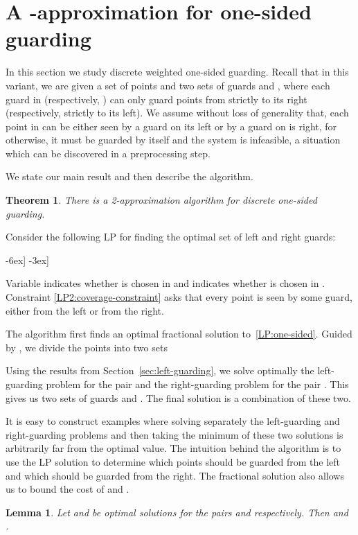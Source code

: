 \documentclass[11pt]{article}
\newtheorem{theorem}{Theorem}
\newtheorem{lemma}{Lemma}
\begin{document}
\section{A -approximation for one-sided guarding}
\label{sec:one-sided-guarding}

In this section we study discrete weighted one-sided guarding. Recall that in
this variant, we are given a set of points  and two sets of guards 
and , where each guard in  (respectively, ) can only guard
points from  strictly to its right (respectively, strictly to its left).
We assume without loss of generality that, each point in  can be either
seen by a guard on its left or by a guard on is right, for otherwise, it must
be guarded by itself and the system is infeasible, a situation which can be
discovered in a preprocessing step.

We state our main result and then describe the algorithm.

\begin{theorem} \label{thm:one-sided}
  There is a 2-approximation algorithm for discrete one-sided guarding.
\end{theorem}

Consider the following LP for finding the optimal set of left and right guards:

-6ex] \notag
-3ex]
 

Variable  indicates whether  is chosen in  and 
indicates whether  is chosen in .  Constraint
\eqref{LP2:coverage-constraint} asks that every point is seen by some guard,
either from the left or from the right.

The algorithm first finds an optimal fractional solution 
to~\eqref{LP:one-sided}. Guided by , we divide the points into two
sets


Using the results from Section~\ref{sec:left-guarding}, we solve optimally the
left-guarding problem for the pair  and the right-guarding problem
for the pair . This gives us two sets of guards  and .
The final solution is a combination of these two.

It is easy to construct examples where solving separately the left-guarding
and right-guarding problems and then taking the minimum of these two solutions
is arbitrarily far from the optimal value. The intuition behind the algorithm
is to use the LP solution to determine which points should be guarded from the
left and which should be guarded from the right. The fractional solution also
allows us to bound the cost of  and .

\begin{lemma} \label{lem:AL}
  Let  and  be optimal solutions for the pairs  and 
  respectively. Then  and .
\end{lemma}
\end{document}
